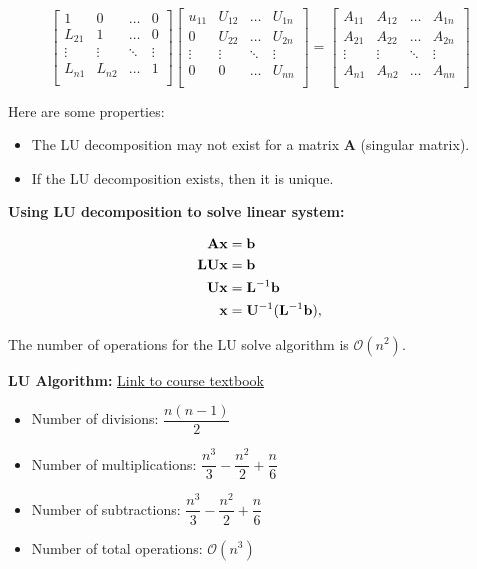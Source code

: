 \documentclass[12pt]{article}
\begin{document}
$$\begin{bmatrix} 1 & 0 & \ldots & 0 \\ L_{21} & 1 & \ldots & 0 \\ \vdots & \vdots & \ddots & \vdots \\ L_{n1} & L_{n2} & \ldots & 1 \\ \end{bmatrix} \begin{bmatrix} u_{11} & U_{12} & \ldots & U_{1n} \\ 0 & U_{22} & \ldots & U_{2n} \\ \vdots & \vdots & \ddots & \vdots \\ 0 & 0 & \ldots & U_{nn} \\ \end{bmatrix} = \begin{bmatrix} A_{11} & A_{12} & \ldots & A_{1n} \\ A_{21} & A_{22} & \ldots & A_{2n} \\ \vdots & \vdots & \ddots & \vdots \\ A_{n1} & A_{n2} & \ldots & A_{nn} \\ \end{bmatrix}$$

Here are some properties:
    \begin{itemize}
        \item The LU decomposition may not exist for a matrix $\mathbf{A}$ (singular matrix).
        \item If the LU decomposition exists, then it is unique.
    \end{itemize}

\medskip
\noindent \textbf{Using LU decomposition to solve linear system:}


\begin{align*}
{\bf A x} &= {\bf b} \\ {\bf L U x} &= {\bf b} \\ {\bf U x} &= {\bf L}^{-1} {\bf b} \\ {\bf x} &= {\bf U}^{-1} ({\bf L}^{-1} {\bf b}), 
\end{align*}

The number of operations for the LU solve algorithm is $\mathcal{O}(n^2)$.

\medskip
\noindent \textbf{LU Algorithm:} 
\href{https://cs357.github.io/textbook/notes/linsys.html#the-lu-decomposition-algorithm}{Link to course textbook}

\begin{itemize}
    \item Number of divisions: $\dfrac{n(n-1)}{2}$
    \item Number of multiplications: $\dfrac{n^3}{3} - \dfrac{n^2}{2} + \dfrac{n}{6}$
    \item Number of subtractions: $\dfrac{n^3}{3} - \dfrac{n^2}{2} + \dfrac{n}{6}$
    \item Number of total operations: $\mathcal{O}(n^3)$
\end{itemize}
\end{document}

